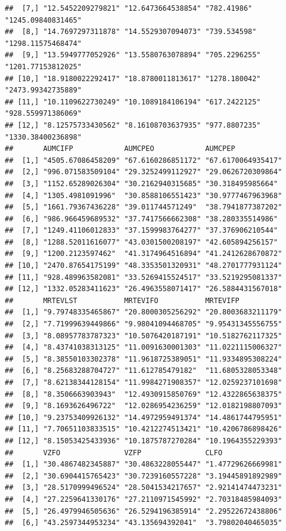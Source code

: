 \documentclass[
  10pt,
]{krantz}
\begin{document}
\begin{verbatim}
##  [7,] "12.5452209279821" "12.6473664538854" "782.41986"    "1245.09840831465"
##  [8,] "14.7697297311878" "14.5529307094073" "739.534598"   "1298.11575468474"
##  [9,] "13.5949777052926" "13.5580763078894" "705.2296255"  "1201.77153812025"
## [10,] "18.9180022292417" "18.8780011813617" "1278.180042"  "2473.99342735889"
## [11,] "10.1109622730249" "10.1089184106194" "617.2422125"  "928.559971386069"
## [12,] "8.12575733430562" "8.16108703637935" "977.8807235"  "1330.38400236898"
##       AUMCIFP            AUMCPEO            AUMCPEP           
##  [1,] "4505.67086458209" "67.6160286851172" "67.6170064935417"
##  [2,] "996.071583509104" "29.3252499112927" "29.0626720309864"
##  [3,] "1152.65289026304" "30.2162940315685" "30.318495985664" 
##  [4,] "1305.4981091996"  "30.8588106551423" "30.9777467963968"
##  [5,] "1661.79367436228" "39.011744571249"  "38.7941877387202"
##  [6,] "986.966459689532" "37.7417566662308" "38.280335514986" 
##  [7,] "1249.41106012833" "37.1599983764277" "37.376906210544" 
##  [8,] "1288.52011616077" "43.0301500208197" "42.605894256157" 
##  [9,] "1200.2123597462"  "41.3174964516894" "41.2412628670872"
## [10,] "2470.87654175199" "48.3353501320931" "48.2701777931124"
## [11,] "928.489963582081" "33.5269415524517" "33.5219295081337"
## [12,] "1332.05283411623" "26.4963558071417" "26.5884431567018"
##       MRTEVLST           MRTEVIFO           MRTEVIFP          
##  [1,] "9.79748335465867" "20.8000305256292" "20.8003683211179"
##  [2,] "7.71999639449866" "9.98041094468705" "9.95431345556755"
##  [3,] "8.08957783787323" "10.5076420187191" "10.5182762117325"
##  [4,] "8.43741038313125" "11.0091630001303" "11.0221115006327"
##  [5,] "8.38550103302378" "11.9618725389051" "11.9334895308224"
##  [6,] "8.25683288704727" "11.612785479182"  "11.6805328053348"
##  [7,] "8.62138344128154" "11.9984271908357" "12.0259237101698"
##  [8,] "8.3506663903943"  "12.4930915850769" "12.4322865638375"
##  [9,] "8.1693626496722"  "12.0286954236259" "12.0182198807093"
## [10,] "9.23753409926132" "14.4972959491374" "14.4861744795951"
## [11,] "7.70651103833515" "10.4212274513421" "10.4206786898426"
## [12,] "8.15053425433936" "10.1875787270284" "10.1964355229393"
##       VZFO               VZFP               CLFO              
##  [1,] "30.4867482345887" "30.4863228055447" "1.47729626669981"
##  [2,] "30.6904415765423" "30.7239160557228" "3.19445891892989"
##  [3,] "28.5170999496524" "28.5041534217657" "2.92141474473231"
##  [4,] "27.2259641330176" "27.2110971545992" "2.70318485984093"
##  [5,] "26.4979946505636" "26.5294196385914" "2.29522672438806"
##  [6,] "43.2597344953234" "43.135694392041"  "3.79802040465035"

\end{verbatim}
\end{document}
